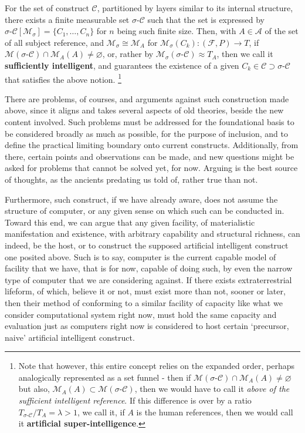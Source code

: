 \begin{conjecture}
\begin{enumerate}
    \end{enumerate}
    For the set of construct $\mathcal{C}$, partitioned by layers similar to its internal structure, there exists a finite measurable set $\sigma\text{-}\mathcal{C}$ such that the set is expressed by $\sigma\text{-}\mathcal{C}[\mathcal{M}_{\sigma}]=\{C_{1},\dots,C_{n}\}$ for $n$ being such finite size. Then, with $A\in \mathcal{A}$ of the set of all subject reference, and $\mathcal{M}_{\sigma}\cong \mathcal{M}_{A}$ for $\mathcal{M}_{\sigma}(C_{k}): (\mathcal{F},P)\to T$, if $\mathcal{M}(\sigma\text{-}\mathcal{C})\cap \mathcal{M}_{A}(A)\neq \varnothing$, or, rather by $\mathcal{M}_{\sigma}(\sigma\text{-}\mathcal{C})\approx T_{A}$, then we call it \textbf{sufficiently intelligent}, and guarantees the existence of a given $C_{k}\in \mathcal{C}\supset \mathcal{\sigma\text{-}\mathcal{C}}$ that satisfies the above notion. \footnote{Note that however, this entire concept relies on the expanded order, perhaps analogically represented as a set funnel - then if $\mathcal{M}(\sigma\text{-}\mathcal{C})\cap \mathcal{M}_{A}(A)\neq \varnothing$ but also, $\mathcal{M}_{A}(A)\subset\mathcal{M}(\sigma\text{-}\mathcal{C})$, then we would have to call it \textit{above of the sufficient intelligent reference}. If this difference is over by a ratio $T_{\sigma\text{-}\mathcal{C}}/T_{A} = \lambda > 1$, we call it, if $A$ is the human references, then we would call it \textbf{artificial super-intelligence}.}
\end{conjecture}
There are problems, of courses, and arguments against such construction made above, since it aligns and takes several aspects of old theories, beside the new content involved. Such problems must be addressed for the foundational basis to be considered broadly as much as possible, for the purpose of inclusion, and to define the practical limiting boundary onto current constructs. Additionally, from there, certain points and observations can be made, and new questions might be asked for problems that cannot be solved yet, for now. Arguing is the best source of thoughts, as the ancients predating us told of, rather true than not.

Furthermore, such construct, if we have already aware, does not assume the structure of computer, or any given sense on which such can be conducted in. Toward this end, we can argue that any given facility, of materialistic manifestation and existence, with arbitrary capability and structural richness, can indeed, be the host, or to construct the supposed artificial intelligent construct one posited above. Such is to say, computer is the current capable model of facility that we have, that is for now, capable of doing such, by even the narrow type of computer that we are considering against. If there exists extraterrestrial lifeform, of which, believe it or not, must exist more than not, sooner or later, then their method of conforming to a similar facility of capacity like what we consider computational system right now, must hold the same capacity and evaluation just as computers right now is considered to host certain `precursor, naive' artificial intelligent construct. 

